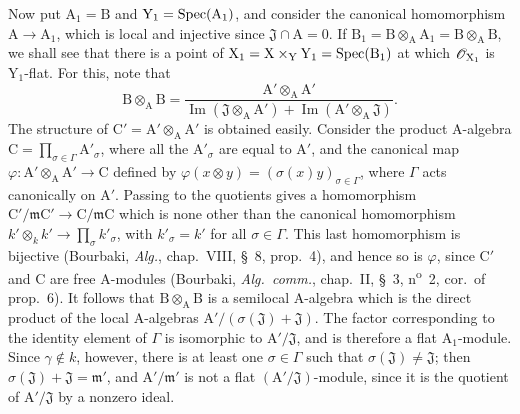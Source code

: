 \begin{env}[11.7.1]
Now put $\mathrm{A}_1=\mathrm{B}$ and $\mathrm{Y}_1=\operatorname{Spec}(\mathrm{A}_1)$, and consider the canonical homomorphism $\mathrm{A}\to\mathrm{A}_1$, which is local and injective since $\mathfrak{J}\cap\mathrm{A}=0$. If $\mathrm{B}_1=\mathrm{B}\otimes_\mathrm{A}\mathrm{A}_1=\mathrm{B}\otimes_\mathrm{A}\mathrm{B}$, we shall see that there is a point of $\mathrm{X}_1=\mathrm{X}\times_\mathrm{Y}\mathrm{Y}_1=\operatorname{Spec}(\mathrm{B}_1)$ at which $\mathscr{O}_{\mathrm{X}_1}$ is $\mathrm{Y}_1$-flat.
For this, note that
\[
\mathrm{B}\otimes_\mathrm{A}\mathrm{B}
=\frac{\mathrm{A}'\otimes_\mathrm{A}\mathrm{A}'}
{\operatorname{Im}(\mathfrak{J}\otimes_\mathrm{A}\mathrm{A}')+\operatorname{Im}(\mathrm{A}'\otimes_\mathrm{A}\mathfrak{J})}.
\]
The structure of $\mathrm{C}'=\mathrm{A}'\otimes_\mathrm{A}\mathrm{A}'$ is obtained easily. Consider the product $\mathrm{A}$-algebra $\mathrm{C}=\prod_{\sigma\in\Gamma}\mathrm{A}'_\sigma$, where all the $\mathrm{A}'_\sigma$ are equal to $\mathrm{A}'$, and the canonical map $\varphi:\mathrm{A}'\otimes_\mathrm{A}\mathrm{A}'\to\mathrm{C}$ defined by $\varphi(x\otimes y)=(\sigma(x)y)_{\sigma\in\Gamma}$, where $\Gamma$ acts canonically on $\mathrm{A}'$. Passing to the quotients gives a homomorphism $\mathrm{C}'/\mathfrak{m}\mathrm{C}'\to\mathrm{C}/\mathfrak{m}\mathrm{C}$ which is none other than the canonical homomorphism $k'\otimes_k k'\to\prod_\sigma k'_\sigma$, with $k'_\sigma=k'$ for all $\sigma\in\Gamma$. This last homomorphism is bijective (Bourbaki, \emph{Alg.}, chap.~VIII, \S~8, prop.~4), and hence so is $\varphi$, since $\mathrm{C}'$ and $\mathrm{C}$ are free $\mathrm{A}$-modules (Bourbaki, \emph{Alg.\ comm.}, chap.~II, \S~3, n\textsuperscript{o}~2, cor.~of prop.~6).
It follows that $\mathrm{B}\otimes_\mathrm{A}\mathrm{B}$ is a semilocal $\mathrm{A}$-algebra which is the direct product of the local $\mathrm{A}$-algebras $\mathrm{A}'/(\sigma(\mathfrak{J})+\mathfrak{J})$. The factor corresponding to the identity element of $\Gamma$ is isomorphic to $\mathrm{A}'/\mathfrak{J}$, and is therefore a flat $\mathrm{A}_1$-module. Since $\gamma\notin k$, however, there is at least one $\sigma\in\Gamma$ such that $\sigma(\mathfrak{J})\ne\mathfrak{J}$; then $\sigma(\mathfrak{J})+\mathfrak{J}=\mathfrak{m}'$, and $\mathrm{A}'/\mathfrak{m}'$ is not a flat $(\mathrm{A}'/\mathfrak{J})$-module, since it is the quotient of $\mathrm{A}'/\mathfrak{J}$ by a nonzero ideal.
\end{env}

